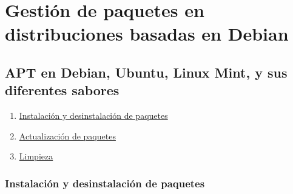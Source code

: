 \section{Gestión de paquetes en distribuciones basadas en
Debian}\label{gestiuxf3n-de-paquetes-en-distribuciones-basadas-en-debian}

\subsection{APT en Debian, Ubuntu, Linux Mint, y sus diferentes
sabores}\label{apt-en-debian-ubuntu-linux-mint-y-sus-diferentes-sabores}

\begin{enumerate}
\def\labelenumi{\arabic{enumi}.}
\tightlist
\item
  \protect\hyperlink{instalaciuxf3n-y-desinstalaciuxf3n-de-paquetes}{Instalación
  y desinstalación de paquetes}
\item
  \protect\hyperlink{actualizaciuxf3n-de-paquetes}{Actualización de
  paquetes}
\item
  \protect\hyperlink{limpieza}{Limpieza}
\end{enumerate}

\hypertarget{instalaciuxf3n-y-desinstalaciuxf3n-de-paquetes}{\subsubsection{Instalación
y desinstalación de
paquetes}\label{instalaciuxf3n-y-desinstalaciuxf3n-de-paquetes}}

